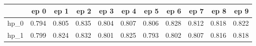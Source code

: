 \begin{tabular}{lrrrrrrrrrr}
\toprule
{} &   ep 0 &   ep 1 &   ep 2 &   ep 3 &   ep 4 &   ep 5 &   ep 6 &   ep 7 &   ep 8 &   ep 9 \\
\midrule
hp\_0 &  0.794 &  0.805 &  0.835 &  0.804 &  0.807 &  0.806 &  0.828 &  0.812 &  0.818 &  0.822 \\
hp\_1 &  0.799 &  0.824 &  0.832 &  0.801 &  0.825 &  0.793 &  0.802 &  0.807 &  0.816 &  0.818 \\
\bottomrule
\end{tabular}

